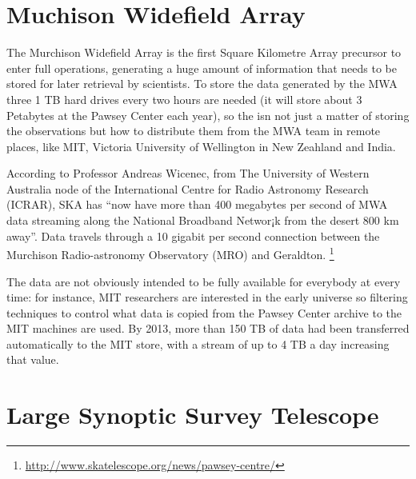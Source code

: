 


\section{Muchison Widefield Array} %
\label{sec:muchison_widefield_array}

The Murchison Widefield Array is the first Square Kilometre Array precursor to enter full operations, generating a huge amount of information that needs to be stored for later retrieval by scientists. To store the data generated by the MWA three 1 TB hard drives every two hours are needed (it will store about 3 Petabytes at the Pawsey Center each year), so the isn not just a matter of storing the observations but how to distribute them from the MWA team in remote places, like MIT, Victoria University of Wellington in New Zeahland and India. 

According to Professor Andreas Wicenec, from The University of Western Australia node of the International Centre for Radio Astronomy Research (ICRAR), SKA has ``now have more than 400 megabytes per second of MWA data streaming along the National Broadband Networ¡k from the desert 800 km away''. Data travels through a 10 gigabit per second connection between the Murchison Radio-astronomy Observatory (MRO) and Geraldton. \footnote{\url{http://www.skatelescope.org/news/pawsey-centre/}}

The data are not obviously intended to be fully available for everybody at every time: for instance, MIT researchers are interested in the early universe so filtering techniques to control what data is copied from the Pawsey Center archive to the MIT machines are used. By 2013, more than 150 TB of data had been transferred automatically to the MIT store, with a stream of up to 4 TB a day increasing that value. 




\section{Large Synoptic Survey Telescope} %
\label{sec:large_synoptic_survey_telescope}

